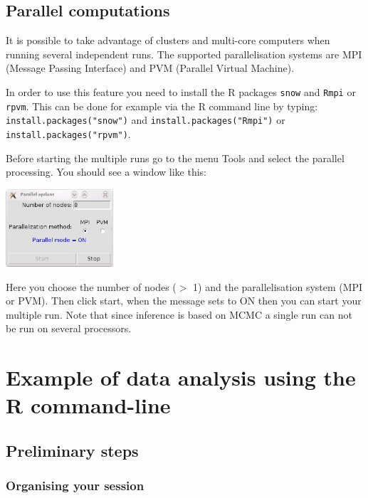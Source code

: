 \documentclass{article}
\begin{document}
\subsection{Parallel computations}

It is possible to take advantage of clusters and multi-core computers when running several independent runs. 
The supported parallelisation systems are MPI (Message Passing Interface) and PVM (Parallel Virtual Machine).

In order to use this feature you need to install the  R packages \texttt{snow} and \texttt{Rmpi} or \texttt{rpvm}.
This can be done for example via the  R command line by typing:
\texttt{install.packages("snow")}  and  
\texttt{install.packages("Rmpi")} 
or
\texttt{install.packages("rpvm")}.

Before starting the multiple runs go to the menu Tools and select the parallel processing. You should see a window like this:

\centerline{\includegraphics[width=4cm]{../inst/images/parallel.jpg}}

Here you choose the number of nodes ($>$ 1) and the parallelisation system (MPI or PVM). 
Then click start, when the message sets to ON then you can start your multiple run. 
Note that since inference is based on MCMC a  single run can not be run on several processors.

\clearpage
\section[Examples with the command-line]{Example of data analysis using the R command-line}


  
\subsection{Preliminary steps}

\subsubsection{Organising your session}
\end{document}
